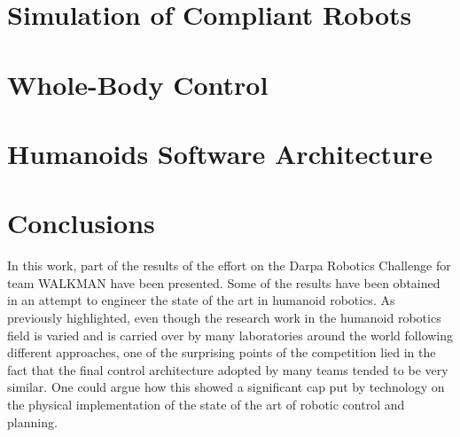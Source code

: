 \documentclass[%
	paper=A4,					%
	twoside=true,				%
	openright,			.
	parskip=full,				%
	chapterprefix=true,			%
	11pt,						%
	headings=normal,			%
	bibliography=totoc,			%
	listof=totoc,				%
	titlepage=on,				%
	captions=tableabove,		%
	draft=true,				%
]{scrreprt}%
\begin{document}
 
\chapter{Simulation of Compliant Robots}
\label{simulator}


\chapter{Whole-Body Control}
\label{opensot}


\chapter{Humanoids Software Architecture}
\label{architecture}


\chapter{Conclusions}

In this work, part of the results of the effort on the Darpa Robotics Challenge for team WALKMAN have been presented.
Some of the results have been obtained in an attempt to engineer the state of the art in humanoid robotics.
As previously highlighted, even though the research work in the humanoid robotics field is varied and is carried over by many laboratories around the world following different approaches, one of the surprising points of the competition lied in the fact that the final control architecture adopted by many teams tended to be very similar. One could argue how this showed a significant cap put by technology on the physical implementation of the state of the art of robotic control and planning.
\end{document}
